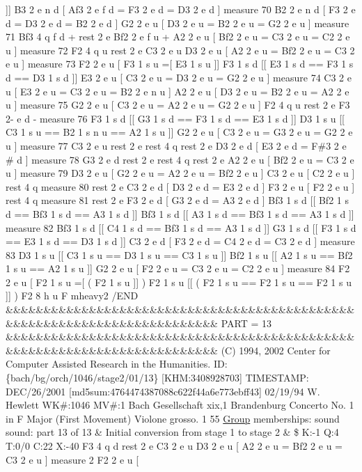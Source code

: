 \mbox{]}\mbox{]} B3 2 e n d \mbox{[} Af3 2 e f d = F3 2 e d = D3 2 e d \mbox{]} measure 70 B2 2 e n d \mbox{[} F3 2 e d = D3 2 e d = B2 2 e d \mbox{]} G2 2 e u \mbox{[} D3 2 e u = B2 2 e u = G2 2 e u \mbox{]} measure 71 Bf3 4 q f d + rest 2 e Bf2 2 e f u + A2 2 e u \mbox{[} Bf2 2 e u = C3 2 e u = C2 2 e u \mbox{]} measure 72 F2 4 q u rest 2 e C3 2 e u D3 2 e u \mbox{[} A2 2 e u = Bf2 2 e u = C3 2 e u \mbox{]} measure 73 F2 2 e u \mbox{[} F3 1 s u =\mbox{[} E3 1 s u \mbox{]}\mbox{]} F3 1 s d \mbox{[}\mbox{[} E3 1 s d == F3 1 s d == D3 1 s d \mbox{]}\mbox{]} E3 2 e u \mbox{[} C3 2 e u = D3 2 e u = G2 2 e u \mbox{]} measure 74 C3 2 e u \mbox{[} E3 2 e u = C3 2 e u = B2 2 e n u \mbox{]} A2 2 e u \mbox{[} D3 2 e u = B2 2 e u = A2 2 e u \mbox{]} measure 75 G2 2 e u \mbox{[} C3 2 e u = A2 2 e u = G2 2 e u \mbox{]} F2 4 q u rest 2 e F3 2-\/ e d -\/ measure 76 F3 1 s d \mbox{[}\mbox{[} G3 1 s d == F3 1 s d == E3 1 s d \mbox{]}\mbox{]} D3 1 s u \mbox{[}\mbox{[} C3 1 s u == B2 1 s n u == A2 1 s u \mbox{]}\mbox{]} G2 2 e u \mbox{[} C3 2 e u = G3 2 e u = G2 2 e u \mbox{]} measure 77 C3 2 e u rest 2 e rest 4 q rest 2 e D3 2 e d \mbox{[} E3 2 e d = F\#3 2 e \# d \mbox{]} measure 78 G3 2 e d rest 2 e rest 4 q rest 2 e A2 2 e u \mbox{[} Bf2 2 e u = C3 2 e u \mbox{]} measure 79 D3 2 e u \mbox{[} G2 2 e u = A2 2 e u = Bf2 2 e u \mbox{]} C3 2 e u \mbox{[} C2 2 e u \mbox{]} rest 4 q measure 80 rest 2 e C3 2 e d \mbox{[} D3 2 e d = E3 2 e d \mbox{]} F3 2 e u \mbox{[} F2 2 e u \mbox{]} rest 4 q measure 81 rest 2 e F3 2 e d \mbox{[} G3 2 e d = A3 2 e d \mbox{]} Bf3 1 s d \mbox{[}\mbox{[} Bf2 1 s d == Bf3 1 s d == A3 1 s d \mbox{]}\mbox{]} Bf3 1 s d \mbox{[}\mbox{[} A3 1 s d == Bf3 1 s d == A3 1 s d \mbox{]}\mbox{]} measure 82 Bf3 1 s d \mbox{[}\mbox{[} C4 1 s d == Bf3 1 s d == A3 1 s d \mbox{]}\mbox{]} G3 1 s d \mbox{[}\mbox{[} F3 1 s d == E3 1 s d == D3 1 s d \mbox{]}\mbox{]} C3 2 e d \mbox{[} F3 2 e d = C4 2 e d = C3 2 e d \mbox{]} measure 83 D3 1 s u \mbox{[}\mbox{[} C3 1 s u == D3 1 s u == C3 1 s u \mbox{]}\mbox{]} Bf2 1 s u \mbox{[}\mbox{[} A2 1 s u == Bf2 1 s u == A2 1 s u \mbox{]}\mbox{]} G2 2 e u \mbox{[} F2 2 e u = C3 2 e u = C2 2 e u \mbox{]} measure 84 F2 2 e u \mbox{[} F2 1 s u =\mbox{[} ( F2 1 s u \mbox{]}\mbox{]} ) F2 1 s u \mbox{[}\mbox{[} ( F2 1 s u == F2 1 s u == F2 1 s u \mbox{]}\mbox{]} ) F2 8 h u F mheavy2 /\+E\+ND \&\&\&\&\&\&\&\&\&\&\&\&\&\&\&\&\&\&\&\&\&\&\&\&\&\&\&\&\&\&\&\&\&\&\&\&\&\&\&\&\&\&\&\&\&\&\&\&\&\&\&\&\&\&\&\&\&\&\&\&\&\&\&\&\&\&\&\&\&\&\&\&\&\& P\+A\+RT = 13 \&\&\&\&\&\&\&\&\&\&\&\&\&\&\&\&\&\&\&\&\&\&\&\&\&\&\&\&\&\&\&\&\&\&\&\&\&\&\&\&\&\&\&\&\&\&\&\&\&\&\&\&\&\&\&\&\&\&\&\&\&\&\&\&\&\&\&\&\&\&\&\&\&\& (C) 1994, 2002 Center for Computer Assisted Research in the Humanities. ID\+: \{bach/bg/orch/1046/stage2/01/13\} \mbox{[}K\+HM\+:3408928703\mbox{]} T\+I\+M\+E\+S\+T\+A\+MP\+: D\+E\+C/26/2001 \mbox{[}md5sum\+:4764474387088c622f44a6e773ebff43\mbox{]} 02/19/94 W. Hewlett WK\#\+:1046 MV\#\+:1 Bach Gesellschaft xix,1 Brandenburg Concerto No. 1 in F Major (First Movement) Violone grosso. 1 55 \hyperlink{class_group}{Group} memberships\+: sound sound\+: part 13 of 13 \& Initial conversion from stage 1 to stage 2 \& \$ K\+:-\/1 Q\+:4 T\+:0/0 C\+:22 X\+:-\/40 F3 4 q d rest 2 e C3 2 e u D3 2 e u \mbox{[} A2 2 e u = Bf2 2 e u = C3 2 e u \mbox{]} measure 2 F2 2 e u \mbox{[} 